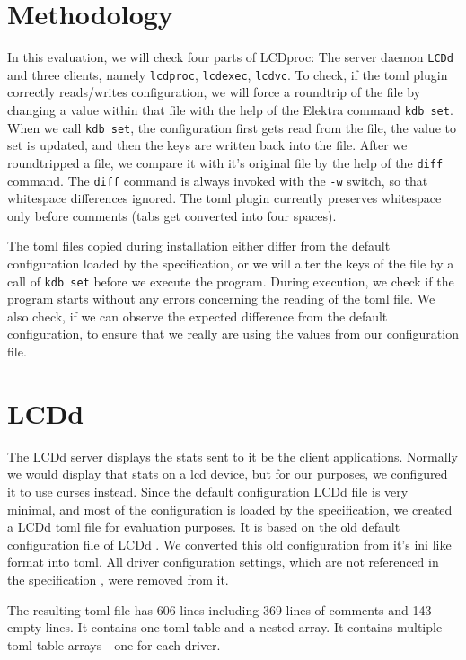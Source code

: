 \documentclass[12pt]{report}
\begin{document}
\section{Methodology}
In this evaluation, we will check four parts of LCDproc: The server daemon \texttt{LCDd} and three clients, namely \texttt{lcdproc}, \texttt{lcdexec}, \texttt{lcdvc}.
To check, if the \acrshort{toml} plugin correctly reads/writes configuration, we will force a roundtrip of the file by changing a value within that file with the help of the Elektra command \texttt{kdb set}.
When we call \texttt{kdb set}, the configuration first gets read from the file, the value to set is updated, and then the keys are written back into the file.
After we roundtripped a file, we compare it with it's original file by the help of the \texttt{diff} command.
The \texttt{diff} command is always invoked with the \texttt{-w} switch, so that whitespace differences ignored.
The \acrshort{toml} plugin currently preserves whitespace only before comments (tabs get converted into four spaces).

The \acrshort{toml} files copied during installation either differ from the default configuration loaded by the specification, or we will alter the keys of the file by a call of \texttt{kdb set} before we execute the program.
During execution, we check if the program starts without any errors concerning the reading of the \acrshort{toml} file.
We also check, if we can observe the expected difference from the default configuration, to ensure that we really are using the values from our configuration file.

\section{LCDd}
The LCDd server displays the stats sent to it be the client applications. Normally we would display that stats on a \acrshort{lcd} device, but for our purposes, we configured it to use curses instead.
Since the default configuration LCDd file is very minimal, and most of the configuration is loaded by the specification, we created a LCDd \acrshort{toml} file for evaluation purposes.
It is based on the old default configuration file of LCDd \cite{LCDprocconf}.
We converted this old configuration from it's ini like format into \acrshort{toml}.
All driver configuration settings, which are not referenced in the specification \cite{bauhaus93forklcdprocslcddspec}, were removed from it.

The resulting \acrshort{toml} file has 606 lines including 369 lines of comments and 143 empty lines.
It contains one \acrshort{toml} table and a nested array.
It contains multiple \acrshort{toml} table arrays - one for each driver.
\end{document}
